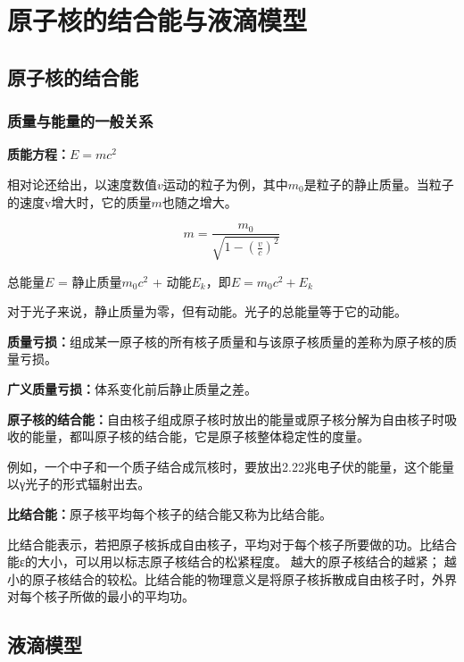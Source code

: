 \chapter{原子核的结合能与液滴模型}

\section{原子核的结合能}

\subsection{质量与能量的一般关系}

\textbf{质能方程：}$E=mc^2$

相对论还给出，以速度数值$v$运动的粒子为例，其中$m_0$是粒子的静止质量。当粒子的速度v增大时，它的质量$m$也随之增大。

$$ m = \frac{m_0}{\sqrt{ 1 - (\frac{v}{c})^2}} $$

总能量$E$ = 静止质量$m_0c^2$ + 动能$E_k$，即$E=m_0c^2 + E_k$

对于光子来说，静止质量为零，但有动能。光子的总能量等于它的动能。

\textbf{质量亏损：}组成某一原子核的所有核子质量和与该原子核质量的差称为原子核的质量亏损。

\textbf{广义质量亏损：}体系变化前后静止质量之差。

\textbf{原子核的结合能：}自由核子组成原子核时放出的能量或原子核分解为自由核子时吸收的能量，都叫原子核的结合能，它是原子核整体稳定性的度量。

例如，一个中子和一个质子结合成氘核时，要放出2.22兆电子伏的能量，这个能量以γ光子的形式辐射出去。

\textbf{比结合能：}原子核平均每个核子的结合能又称为比结合能。

比结合能表示，若把原子核拆成自由核子，平均对于每个核子所要做的功。比结合能ε的大小，可以用以标志原子核结合的松紧程度。越大的原子核结合的越紧；越小的原子核结合的较松。比结合能的物理意义是将原子核拆散成自由核子时，外界对每个核子所做的最小的平均功。

\section{液滴模型}

